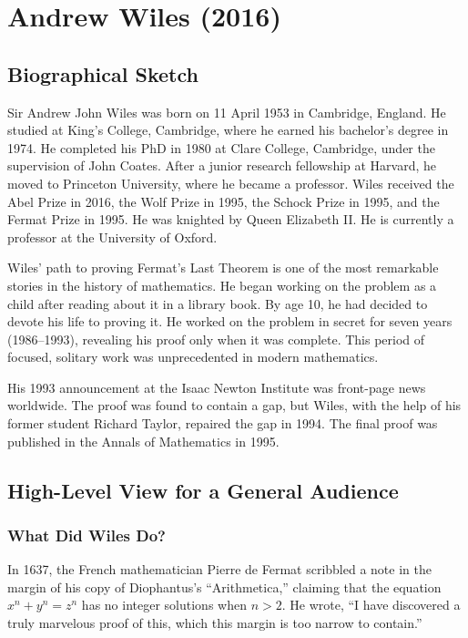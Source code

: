 \chapter{Andrew Wiles (2016)}

\section{Biographical Sketch}

Sir Andrew John Wiles was born on 11 April 1953 in Cambridge, England. He studied at King's College, Cambridge, where he earned his bachelor's degree in 1974. He completed his PhD in 1980 at Clare College, Cambridge, under the supervision of John Coates. After a junior research fellowship at Harvard, he moved to Princeton University, where he became a professor. Wiles received the Abel Prize in 2016, the Wolf Prize in 1995, the Schock Prize in 1995, and the Fermat Prize in 1995. He was knighted by Queen Elizabeth II. He is currently a professor at the University of Oxford.

Wiles' path to proving Fermat's Last Theorem is one of the most remarkable stories in the history of mathematics. He began working on the problem as a child after reading about it in a library book. By age 10, he had decided to devote his life to proving it. He worked on the problem in secret for seven years (1986--1993), revealing his proof only when it was complete. This period of focused, solitary work was unprecedented in modern mathematics.

His 1993 announcement at the Isaac Newton Institute was front-page news worldwide. The proof was found to contain a gap, but Wiles, with the help of his former student Richard Taylor, repaired the gap in 1994. The final proof was published in the Annals of Mathematics in 1995.

\section{High-Level View for a General Audience}

\subsection{What Did Wiles Do?}

In 1637, the French mathematician Pierre de Fermat scribbled a note in the margin of his copy of Diophantus's ``Arithmetica,'' claiming that the equation $x^n + y^n = z^n$ has no integer solutions when $n > 2$. He wrote, ``I have discovered a truly marvelous proof of this, which this margin is too narrow to contain.''

